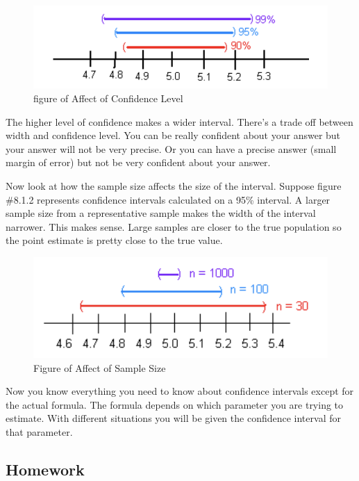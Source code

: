 \documentclass[
]{book}
\begin{document}
\begin{figure}
\centering
\includegraphics{effect_confidence_level.png}
\caption{figure of Affect of Confidence Level}
\end{figure}

The higher level of confidence makes a wider interval. There's a trade off between width and confidence level. You can be really confident about your answer but your answer will not be very precise. Or you can have a precise answer (small margin of error) but not be very confident about your answer.

Now look at how the sample size affects the size of the interval. Suppose figure \#8.1.2 represents confidence intervals calculated on a 95\% interval. A larger sample size from a representative sample makes the width of the interval narrower. This makes sense. Large samples are closer to the true population so the point estimate is pretty close to the true value.

\begin{figure}
\centering
\includegraphics{effect_sample_size.png}
\caption{Figure of Affect of Sample Size}
\end{figure}

Now you know everything you need to know about confidence intervals except for the actual formula. The formula depends on which parameter you are trying to estimate. With different situations you will be given the confidence interval for that parameter.

\hypertarget{homework-19}{%
\subsection{Homework}\label{homework-19}}
\end{document}
